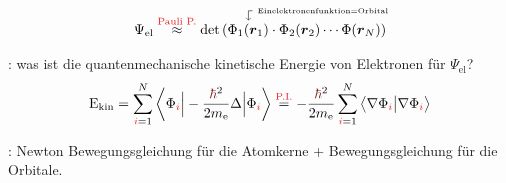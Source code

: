 \begin{notebox}[Nebenbemerkung]
  \begin{align*}
    \Psi_{\text{el}}\stackrel{\rd{\text{Pauli P.}}}{\approx}\det{(\turla{\Phi_1(\rvec_1)}{\normalfont{Einelektronenfunktion=Orbital}}\cdot\Phi_2(\rvec_2)\cdots\Phi(\rvec_N))}
  \end{align*}
\end{notebox}
\begin{sectionbox}\nospacing
  : was ist die quantenmechanische kinetische Energie von  Elektronen für $\Psi_{\text{el}}$?
  \begin{align}
    \Ez_{\text{kin}}=\sum_{\idxi=1}^{N}\left\langle\Phi_{\idxi}\Big|-\frac{\hpr^2}{2m_{\text{e}}}\Delta\Big|\Phi_{\idxi}\right\rangle
    \eqs{\text{\rd{P.I.}}}-\frac{\hpr^2}{2m_{\text{e}}}\sum_{\idxi=1}^{N}\left\langle\nabla\Phi_{\idxi}\big|\nabla\Phi_{\idxi}\right\rangle
  \end{align}
  \begin{figure}[H]
    \vspace{-3em}
    \centering
  \end{figure}
  : Newton Bewegungsgleichung für die Atomkerne + Bewegungsgleichung für die Orbitale.
\end{sectionbox}
